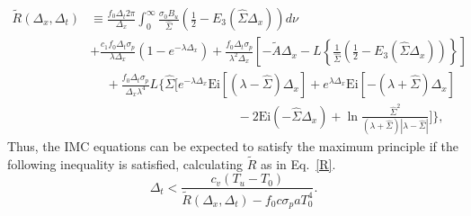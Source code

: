 \begin{align}\label{R}
\tilde R(\Delta_x,\Delta_t)&\equiv\frac{f_0\Delta_t2\pi}{\Delta_x}
  \int_0^\infty\frac{\sigma_0B_u}{\hat\Sigma}\left(\frac{1}{2}-
    E_3(\hat\Sigma\Delta_x)\right)d\nu \nonumber\\
  &+\frac{c_1f_0\Delta_t\sigma_p}{\lambda\Delta_x}(1-e^{-\lambda\Delta_x}) +
  \frac{f_0\Delta_t\sigma_p}{\lambda^2\Delta_x}\left[-\tilde A\Delta_x
    -L\left\{\frac{1}{\hat\Sigma}\left(\frac{1}{2}
    -E_3(\hat\Sigma\Delta_x)\right)\right\}\right] \\
  &\hspace{15pt}+\frac{f_0\Delta_t\sigma_p}{\Delta_x\lambda^4}L\Bigg\{\hat\Sigma
    \bigg[e^{-\lambda\Delta_x}\mbox{Ei}[(\lambda-\hat\Sigma)\Delta_x] +
    e^{\lambda\Delta_x}\mbox{Ei}[-(\lambda+\hat\Sigma)\Delta_x] \nonumber \\
  &\hspace{140pt} -2\mbox{Ei}(-\hat\Sigma\Delta_x)+ \nonumber
    \ln\frac{\hat\Sigma^2}{(\lambda+\hat\Sigma)|\lambda-\hat\Sigma|}
    \bigg]\Bigg\},
\end{align}
Thus, the IMC equations can be expected to satisfy the maximum principle if the
following inequality is satisfied, calculating $\tilde R$ as in Eq.\ \eqref{R}.
\begin{equation}\label{DMP}
\Delta_t<\frac{c_v(T_u-T_0)}{\tilde
R(\Delta_x,\Delta_t)-f_0c\sigma_paT_0^4}.
\end{equation}
